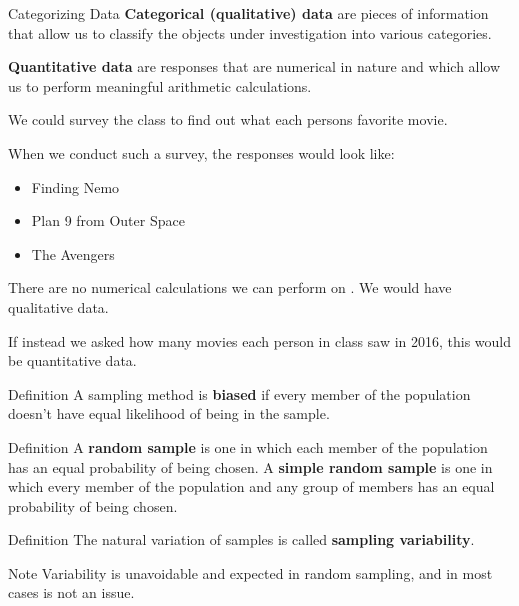 \documentclass{beamer}
\begin{document}
\begin{frame}
\begin{block}{Categorizing Data}
\textbf{Categorical (qualitative) data} are pieces of information that allow us to classify the objects under investigation into various categories.

\textbf{Quantitative data} are responses that are numerical in nature and which allow us to perform meaningful arithmetic calculations.
\end{block}\pause

\begin{example}
We could survey the class to find out what each persons favorite movie.\pause

\vspace{2mm}
When we conduct such a survey, the responses would look like:
\begin{itemize}
\item Finding Nemo
\item Plan 9 from Outer Space
\item The Avengers
\end{itemize}
There are no numerical calculations we can perform on . We would have qualitative data. \pause

\vspace{2mm}
If instead we asked how many movies each person in class saw in 2016, this would be quantitative data.
\end{example}
\end{frame}

\begin{frame}
\begin{block}{Definition}
A sampling method is \textbf{biased} if every member of the population doesn't have equal likelihood of being in the sample.
\end{block}\pause

\begin{block}{Definition}
A \textbf{random sample} is one in which each member of the population has an equal probability of being chosen. A \textbf{simple random sample} is one in which every member of the population and any group of members has an equal probability of being chosen.
\end{block}\pause

\begin{block}{Definition}
The natural variation of samples is called \textbf{sampling variability}.
\end{block}\pause

\begin{block}{Note}
Variability is unavoidable and expected in random sampling, and in most cases is not an issue.
\end{block}
\end{frame}
\end{document}
